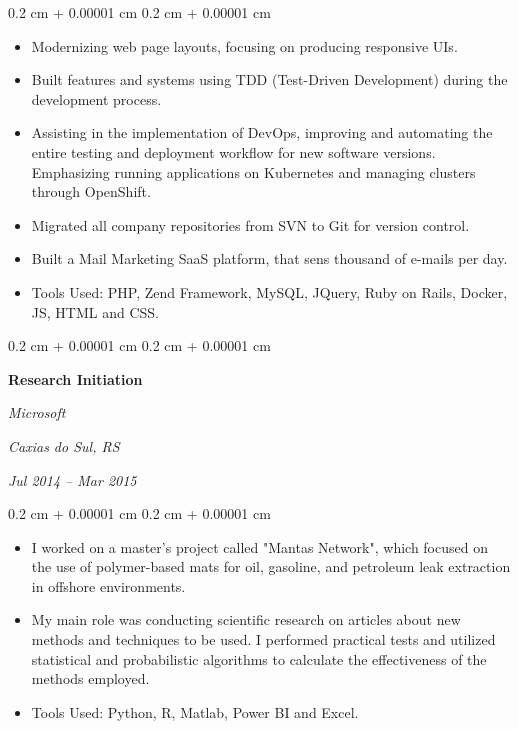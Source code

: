 \documentclass[10pt, letterpaper]{article}
\newenvironment{highlights}{
    \begin{itemize}[
        topsep=0.10 cm,
        parsep=0.10 cm,
        partopsep=0pt,
        itemsep=0pt,
        leftmargin=0.4 cm + 10pt
    ]
}{
    \end{itemize}
} %
\newenvironment{onecolentry}{
    \begin{adjustwidth}{
        0.2 cm + 0.00001 cm
    }{
        0.2 cm + 0.00001 cm
    }
}{
    \end{adjustwidth}
} %
\newenvironment{twocolentry}[2][]{
    \onecolentry
    \def\secondColumn{#2}
    \setcolumnwidth{\fill, 4.5 cm}
    \begin{paracol}{2}
}{
    \switchcolumn \raggedleft \secondColumn
    \end{paracol}
    \endonecolentry
} %
\begin{document}
        \vspace{0.10 cm}
        \begin{onecolentry}
            \begin{highlights}
                \item Modernizing web page layouts, focusing on producing responsive UIs.
                \item Built features and systems using TDD (Test-Driven Development) during the development process.
                \item Assisting in the implementation of DevOps, improving and automating the entire testing and deployment workflow for new software versions. Emphasizing running applications on Kubernetes and managing clusters through OpenShift.
                \item Migrated all company repositories from SVN to Git for version control.
                \item Built a Mail Marketing SaaS platform, that sens thousand of e-mails per day.
                \item Tools Used: PHP, Zend Framework, MySQL, JQuery, Ruby on Rails, Docker, JS, HTML and CSS.
            \end{highlights}
        \end{onecolentry}


        \vspace{0.2 cm}

        \begin{twocolentry}{
        \textit{Caxias do Sul, RS}    
            
        \textit{Jul 2014 – Mar 2015}}
            \textbf{Research Initiation}
            
            \textit{Microsoft}
        \end{twocolentry}

        \vspace{0.10 cm}
        \begin{onecolentry}
            \begin{highlights}
                \item I worked on a master's project called "Mantas Network", which focused on the use of polymer-based mats for oil, gasoline, and petroleum leak extraction in offshore environments.
                \item My main role was conducting scientific research on articles about new methods and techniques to be used. I performed practical tests and utilized statistical and probabilistic algorithms to calculate the effectiveness of the methods employed.
                \item Tools Used: Python, R, Matlab, Power BI and Excel.
            \end{highlights}
        \end{onecolentry}
\end{document}
